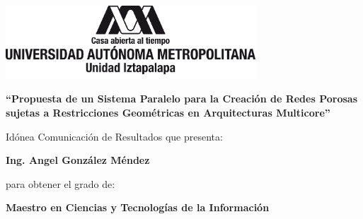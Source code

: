 \thispagestyle{empty}
	

\begingroup
\setlength{\parindent}{0cm}
\begin{minipage}[t]{\textwidth}
	\begin{center}
	\includegraphics[width=0.7\textwidth]{img/variacion3Izt.png}
	\end{center}
\end{minipage}
\endgroup


\vspace{0.8cm}
\begin{center}
\begingroup
\setlength{\parindent}{0cm}
\begin{minipage}[c]{0.70\textwidth}
\begin{center}
\large \bf
``Propuesta de un Sistema Paralelo para la Creación de Redes Porosas sujetas a Restricciones Geométricas en Arquitecturas Multicore''
\end{center}

\centerline{\normalsize  Idónea Comunicación de Resultados que presenta:}
\vspace{0.1cm}
\centerline{\normalsize \bf Ing. Angel González Méndez}
\vspace{0.1cm}
\centerline{\normalsize para obtener el grado de:}
\vspace{0.1cm}
\centerline{\normalsize \bf Maestro en Ciencias y Tecnologías de la Información}

\end{minipage}
\endgroup
\end{center}

